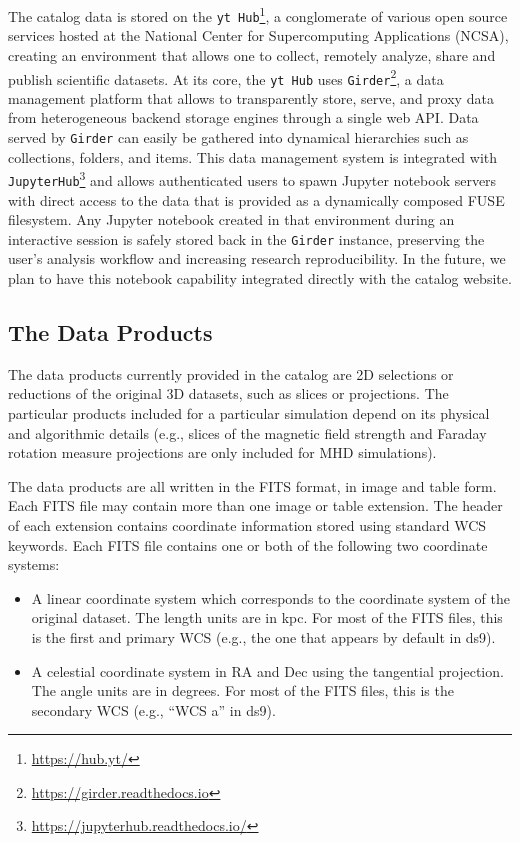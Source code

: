 \documentclass{emulateapj}
\newcommand{\code}[1]{\texttt{#1}}
\begin{document}
The catalog data is stored on the \code{yt Hub}\footnote{\url{https://hub.yt/}}, a conglomerate of various open source
services hosted at the National Center for Supercomputing Applications (NCSA), creating an environment that allows one to collect, remotely analyze, share and publish scientific datasets. At its core, the \code{yt Hub} uses \code{Girder}\footnote{\url{https://girder.readthedocs.io}}, a data management platform that allows to transparently store, serve, and proxy data from heterogeneous backend storage engines through a single
web API. Data served by \code{Girder} can easily be gathered into dynamical hierarchies such as collections, folders, and
items. This data management system is integrated with \code{JupyterHub}\footnote{\url{https://jupyterhub.readthedocs.io/}} and allows authenticated users to spawn Jupyter notebook servers with direct access to the data that is provided as a dynamically composed FUSE filesystem. Any Jupyter
notebook created in that environment during an interactive session is safely stored back in the \code{Girder} instance,
preserving the user's analysis workflow and increasing research reproducibility. In the future, we plan to have this
notebook capability integrated directly with the catalog website.

\subsection{The Data Products}\label{sec:data}

The data products currently provided in the catalog are 2D selections or reductions of the original 3D datasets, such as slices or projections. The particular products included for a particular simulation depend on its physical and algorithmic details (e.g., slices of the magnetic field strength and Faraday rotation measure projections are only included for MHD simulations).

The data products are all written in the FITS format, in image and table form. Each FITS file may contain more than one image or table extension. The header of each extension contains coordinate information stored using standard WCS keywords. Each FITS file contains one or both of the following two coordinate systems:

\begin{itemize}
\item A linear coordinate system which corresponds to the coordinate system of the original dataset. The length units are in kpc. For most of the FITS files, this is the first and primary WCS (e.g., the one that appears by default in ds9).
\item A celestial coordinate system in RA and Dec using the tangential projection. The angle units are in degrees. For most of the FITS files, this is the secondary WCS (e.g., ``WCS a'' in ds9).
\end{itemize}
\end{document}
